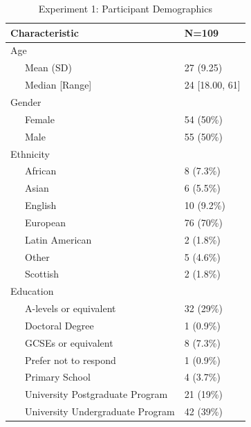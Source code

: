 \documentclass[
  donotrepeattitle,doc, 12pt, a4paper,floatsintext]{apa7}
\begin{document}
\begin{table}[h]

\begin{center}
\begin{threeparttable}

\caption{\label{tab:unnamed-chunk-11}Experiment 1: Participant Demographics}

\begin{tabular}{ll}
\toprule
Characteristic & N=109\\
\midrule
Age & \\
\ \ \ Mean (SD) & 27 (9.25)\\
\ \ \ Median [Range] & 24 [18.00, 61]\\
Gender & \\
\ \ \ Female & 54 (50\%)\\
\ \ \ Male & 55 (50\%)\\
Ethnicity & \\
\ \ \ African & 8 (7.3\%)\\
\ \ \ Asian & 6 (5.5\%)\\
\ \ \ English & 10 (9.2\%)\\
\ \ \ European & 76 (70\%)\\
\ \ \ Latin American & 2 (1.8\%)\\
\ \ \ Other & 5 (4.6\%)\\
\ \ \ Scottish & 2 (1.8\%)\\
Education & \\
\ \ \ A-levels or equivalent & 32 (29\%)\\
\ \ \ Doctoral Degree & 1 (0.9\%)\\
\ \ \ GCSEs or equivalent & 8 (7.3\%)\\
\ \ \ Prefer not to respond & 1 (0.9\%)\\
\ \ \ Primary School & 4 (3.7\%)\\
\ \ \ University Postgraduate Program & 21 (19\%)\\
\ \ \ University Undergraduate Program & 42 (39\%)\\
\bottomrule
\end{tabular}

\end{threeparttable}
\end{center}

\end{table}
\end{document}
